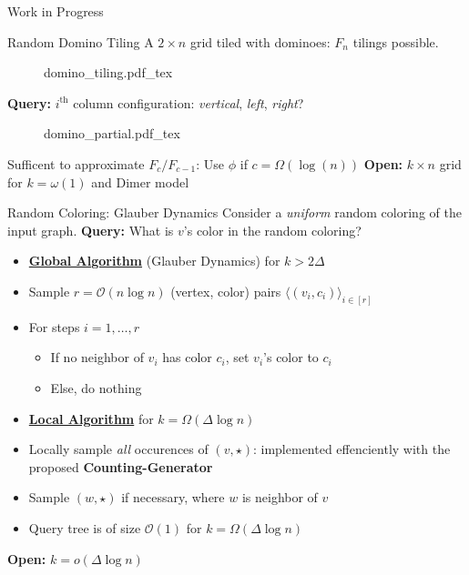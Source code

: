 \begin{block}{Work in Progress}



\begin{alertblock}{Random Domino Tiling}
A $2\times n$ grid tiled with dominoes: $F_n$ tilings possible.
\begin{figure}[h!]\centering
    \def\svgwidth{0.8\columnwidth}
    {domino_tiling.pdf_tex}
\end{figure}
\textbf{Query:} $i^\textrm{th}$ column configuration: \emph{vertical}, \emph{left}, \emph{right}?
\begin{figure}[h!]\centering
    \def\svgwidth{0.8\columnwidth}
    {domino_partial.pdf_tex}
\end{figure}
Sufficent to approximate $F_c/F_{c-1}$: Use $\phi$ if $c = \Omega(\log(n))$
\textbf{Open:} $k\times n$ grid for $k = \omega(1)$ and Dimer model
\end{alertblock}


\begin{alertblock}{Random Coloring: Glauber Dynamics}
Consider a \emph{uniform} random coloring of the input graph.
\textbf{Query:} What is $v$'s color in the random coloring?
\begin{itemize}
    \item [] \underline{\textbf{Global Algorithm}} (Glauber Dynamics) for $k > 2\Delta$
    \item Sample $r=\mathcal O(n\log n)$ (vertex, color) pairs $\langle(v_i, c_i)\rangle_{i\in[r]}$
    \item For steps $i = 1, \ldots, r$
    \begin{itemize}
        \item If no neighbor of $v_i$ has color $c_i$, set $v_i$'s color to $c_i$
        \item Else, do nothing
    \end{itemize}
\end{itemize}

\begin{itemize}
    \item [] \underline{\textbf{Local Algorithm}} for $k = \Omega(\Delta\log n)$
    \item Locally sample \emph{all} occurences of $(v, \star)$: implemented effenciently with the proposed \textbf{Counting-Generator}
    \item Sample $(w, \star)$ if necessary, where $w$ is neighbor of $v$
    \item Query tree is of size $\mathcal{O}(1)$ for $k = \Omega(\Delta\log n)$
\end{itemize}
\textbf{Open:} $k = o(\Delta\log n)$
\end{alertblock}




\end{block}
